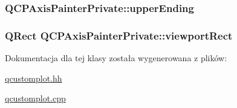\subsubsection[{\texorpdfstring{upper\+Ending}{upperEnding}}]{ Q\+C\+P\+Axis\+Painter\+Private\+::upper\+Ending}\hypertarget{class_q_c_p_axis_painter_private_af764be913be5f924700ac9bbb8c01139}{}\label{class_q_c_p_axis_painter_private_af764be913be5f924700ac9bbb8c01139}
\subsubsection[{\texorpdfstring{viewport\+Rect}{viewportRect}}]{\setlength{\rightskip}{0pt plus 5cm}Q\+Rect Q\+C\+P\+Axis\+Painter\+Private\+::viewport\+Rect}\hypertarget{class_q_c_p_axis_painter_private_a8627dc6b40781e3291bb508e4ac574d6}{}\label{class_q_c_p_axis_painter_private_a8627dc6b40781e3291bb508e4ac574d6}


Dokumentacja dla tej klasy została wygenerowana z plików\+:\begin{DoxyCompactItemize}
\item 
\hyperlink{qcustomplot_8hh}{qcustomplot.\+hh}\item 
\hyperlink{qcustomplot_8cpp}{qcustomplot.\+cpp}\end{DoxyCompactItemize}
